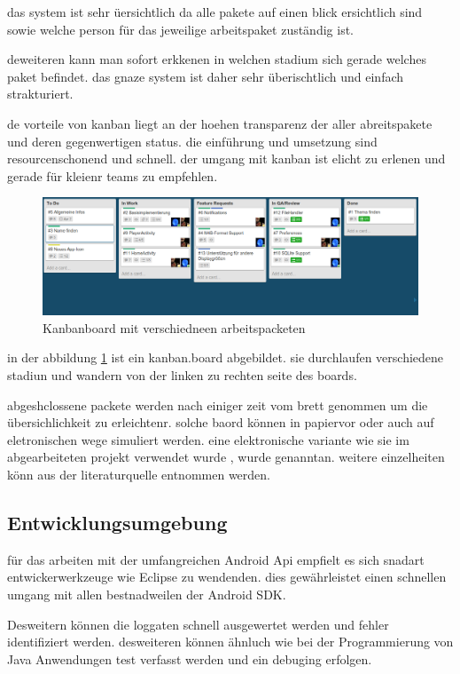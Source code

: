 das system ist sehr üersichtlich da alle pakete auf einen blick ersichtlich sind sowie welche person für das jeweilige arbeitspaket zuständig ist.\newpage

deweiteren kann man sofort erkkenen in welchen stadium sich gerade welches paket befindet. das gnaze system ist daher sehr überischtlich und einfach strakturiert.

de vorteile von kanban liegt an der hoehen transparenz der aller abreitspakete und deren gegenwertigen status. die einführung und umsetzung sind resourcenschonend und schnell. der umgang mit kanban ist elicht zu erlenen und gerade für kleienr teams zu empfehlen.

\begin{figure}
\begin{center}
\includegraphics[scale=0.35]{images/kanban}
\caption{Kanbanboard mit verschiedneen arbeitspacketen}
\label{kanban}
\end{center}
\end{figure}

in der abbildung \ref{kanban} ist ein kanban.board abgebildet. sie durchlaufen verschiedene stadiun und wandern von der linken zu rechten seite des boards.

abgeshclossene packete werden nach einiger zeit vom brett genommen um die übersichlichkeit zu erleichtenr. solche baord können in papiervor oder auch auf eletronischen wege simuliert werden. eine elektronische variante wie sie im abgearbeiteten projekt verwendet wurde , wurde genanntan. weitere einzelheiten könn aus der literaturquelle \cite{9783898647304} entnommen werden.

\subsection{Entwicklungsumgebung}
für das arbeiten mit der umfangreichen Android Api empfielt es sich snadart entwickerwerkzeuge wie Eclipse zu wendenden. dies gewährleistet einen schnellen umgang mit allen bestnadweilen der Android SDK.

Desweitern können die loggaten schnell ausgewertet werden und fehler identifiziert werden. desweiteren können ähnluch wie bei der Programmierung von Java Anwendungen test verfasst werden und ein debuging erfolgen.

